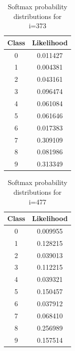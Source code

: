 \documentclass[11pt]{article}
\begin{document}
\begin{table}[!th]
\centering
\begin{tabular}{|c|c|}
\hline
Class & Likelihood \\
\hline
0 & 0.011427 \\
1 & 0.004381 \\
2 & 0.043161 \\
3 & 0.096474 \\
4 & 0.061084 \\
5 & 0.061646 \\
6 & 0.017383 \\
7 & 0.309109 \\
8 & 0.081986 \\
9 & 0.313349 \\
\hline
\end{tabular}
\caption{Softmax probability distributions for i=373}
\label{ex:table}
\end{table}

\begin{table}[!th]
\centering
\begin{tabular}{|c|c|}
\hline
Class & Likelihood \\
\hline
0 & 0.009955 \\
1 & 0.128215 \\
2 & 0.039013 \\
3 & 0.112215 \\
4 & 0.039321 \\
5 & 0.150457 \\
6 & 0.037912 \\
7 & 0.068410 \\
8 & 0.256989 \\
9 & 0.157514 \\
\hline
\end{tabular}
\caption{Softmax probability distributions for i=477}
\label{ex:table}
\end{table}
\end{document}
